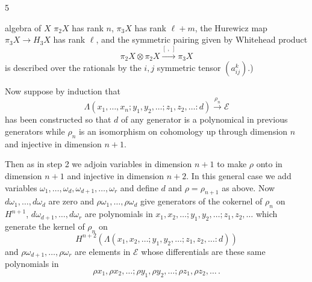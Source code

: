 \begin{flushright}5\end{flushright}

algebra of $X$ \uline{}
$\pi_2X$ has rank $n$, $\pi_3X$ has rank $\ell+m$, the Hurewicz map
$\pi_3X\longrightarrow H_3X$ has rank $\ell$, and the symmetric pairing given by Whitehead product
\[
\pi_2X\otimes\pi_2X\xrightarrow{[\ ,\ ]}\pi_3X
\]
is described over the rationals by the $i,j$ symmetric tensor $(a^k_{ij})$.)

Now suppose by induction that
\[
\Lambda(x_1,\ldots,x_n;y_1,y_2,\ldots;z_1,z_2,\ldots:d)
\xrightarrow{\rho_n}\mathcal E
\]
has been constructed so that $d$ of any generator is a polynomical in previous generators while $\rho_n$ is an isomorphism on cohomology up through dimension $n$ and injective in dimension $n+1$.

Then as in step 2 we adjoin variables in dimension $n+1$ to make $\rho$ onto in dimension $n+1$ and injective in dimension $n+2$. In this general case we add variables
$\omega_1,\ldots,\omega_d,\omega_{d+1},\ldots,\omega_r$
and define $d$ and $\rho=\rho_{n+1}$ as above.
Now $d\omega_1,\ldots,d\omega_d$ are zero and
$\rho\omega_1,\ldots,\rho\omega_d$ give generators of the cokernel of $\rho_n$ on $H^{n+1}$,
$d\omega_{d+1},\ldots,d\omega_r$ are polynomials in
$x_1,x_2,\ldots;y_1,y_2,\ldots;z_1,z_2,\ldots$
which generate the kernel of $\rho_n$ on
\[
H^{n+2}(\Lambda(x_1,x_2,\ldots;y_1,y_2,\ldots;z_1,z_2,\ldots:d))
\]
and $\rho\omega_{d+1},\ldots,\rho\omega_r$ are elements in $\mathcal E$ whose differentials are these same polynomials in
\[
\rho x_1,\rho x_2,\ldots;\rho y_1,\rho y_2,\ldots;\rho z_1,\rho z_2,\ldots\,.
\]
